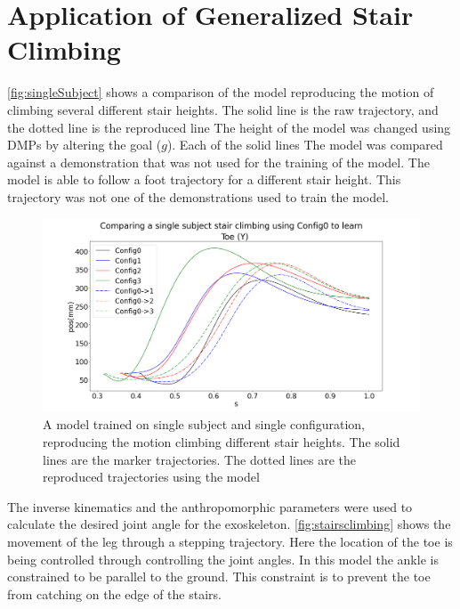 \section{Application of Generalized Stair Climbing}


\autoref{fig:singleSubject} shows a comparison of the model reproducing the motion of climbing several different stair heights.  The solid line is the raw trajectory, and the dotted line is the reproduced line The height of the model was changed using DMPs by altering the goal ($g$). Each of the solid lines  The model was compared against a demonstration that was not used for the training of the model.  The model is able to follow a foot trajectory for a different stair height. This trajectory was not one of the demonstrations used to train the model.

\begin{figure}[h]
    \centering
    \includegraphics[scale=0.3]{images/stairs/compareHeihgts.png}
    \caption[Reproducing the Motion Climbing Different]{A model trained on single subject and single configuration, reproducing the motion climbing different stair heights. The solid lines are the marker trajectories. The dotted lines are the reproduced trajectories using the model}
    \label{fig:singleSubject}
\end{figure}

The inverse kinematics and the anthropomorphic parameters were used to calculate the desired joint angle for the exoskeleton. \autoref{fig:stairsclimbing} shows the movement of the leg through a stepping trajectory. Here the location of the toe is being controlled through controlling the joint angles. In this model the ankle is constrained to be parallel to the ground. This constraint is to prevent the toe from catching on the edge of the stairs.


